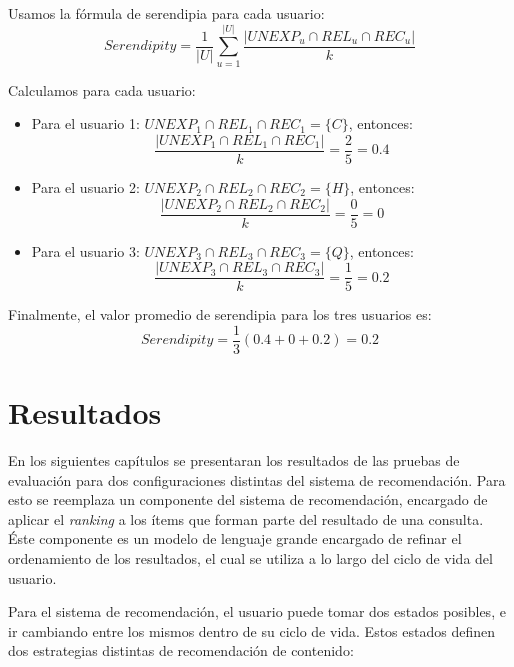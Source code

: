 \documentclass[11pt,a4paper,twoside]{thesis}
\begin{document}
Usamos la fórmula de serendipia para cada usuario:
\[
	Serendipity = \frac{1}{|U|} \sum_{u=1}^{|U|} \frac{|UNEXP_u \cap REL_u \cap REC_u|}{k}
\]

Calculamos para cada usuario:
\begin{itemize}
	\item Para el usuario 1: \( UNEXP_1 \cap REL_1 \cap REC_1 = \{C\} \), entonces:
	      \[
		      \frac{|UNEXP_1 \cap REL_1 \cap REC_1|}{k} = \frac{2}{5} = 0.4
	      \]
	\item Para el usuario 2: \( UNEXP_2 \cap REL_2 \cap REC_2 = \{H\} \), entonces:
	      \[
		      \frac{|UNEXP_2 \cap REL_2 \cap REC_2|}{k} = \frac{0}{5} = 0
	      \]
	\item Para el usuario 3: \( UNEXP_3 \cap REL_3 \cap REC_3 = \{Q\} \), entonces:
	      \[
		      \frac{|UNEXP_3 \cap REL_3 \cap REC_3|}{k} = \frac{1}{5} = 0.2
	      \]
\end{itemize}

Finalmente, el valor promedio de serendipia para los tres usuarios es:
\[
	Serendipity = \frac{1}{3} (0.4 + 0 + 0.2) = 0.2
\]


\chapter{Resultados}

En los siguientes capítulos se presentaran los resultados de las pruebas de evaluación para dos configuraciones distintas del sistema de recomendación. Para esto se reemplaza un componente del sistema de recomendación, encargado de aplicar el \textit{ranking} a los ítems que forman parte del resultado de una consulta. Éste componente es un modelo de lenguaje grande  encargado de refinar el ordenamiento de los resultados, el cual se utiliza a lo largo del ciclo de vida del usuario.

Para el sistema de recomendación, el usuario puede tomar dos estados posibles, e ir cambiando entre los mismos dentro de su ciclo de vida. Estos estados definen dos estrategias distintas de recomendación de contenido:
\end{document}
